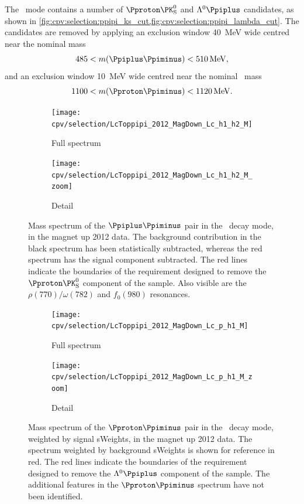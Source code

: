 The \ppipi\ mode contains a number of $\Pproton\PKshort$ and $\PLambda\Ppiplus$
candidates, as shown in
\cref{fig:cpv:selection:ppipi_ks_cut,fig:cpv:selection:ppipi_lambda_cut}.
The candidates are removed by applying an exclusion window \SI{40}{\MeV} wide
centred near the nominal \PKshort mass~\cite{PDG2014}
\begin{equation}
  485 < m(\Ppiplus\Ppiminus) < \SI{510}{\MeV},
\end{equation}
and an exclusion window \SI{10}{\MeV} wide centred near the nominal \PLambda\
mass~\cite{PDG2014}
\begin{equation}
  1100 < m(\Pproton\Ppiminus) < \SI{1120}{\MeV}.
\end{equation}

\begin{figure}
  \begin{subfigure}[b]{0.5\textwidth}
    \texttt{[image: cpv/selection/LcToppipi\_2012\_MagDown\_Lc\_h1\_h2\_M]}
    \caption{Full spectrum}
    \label{fig:cpv:selection:ppipi_ks_cut:full}
  \end{subfigure}
  \begin{subfigure}[b]{0.5\textwidth}
    \texttt{[image: cpv/selection/LcToppipi\_2012\_MagDown\_Lc\_h1\_h2\_M\_zoom]}
    \caption{Detail}
    \label{fig:cpv:selection:ppipi_ks_cut:zoom}
  \end{subfigure}
  \caption{%
    Mass spectrum of the $\Ppiplus\Ppiminus$ pair in the \ppipi\ decay mode, in
    the magnet up 2012 data.
    The background contribution in the black spectrum has been statistically
    subtracted, whereas the red spectrum has the signal component subtracted.
    The red lines indicate the boundaries of the requirement designed to remove
    the $\Pproton\PKshort$ component of the sample.
    Also visible are the $\rho(770)/\omega(782)$ and $f_{0}(980)$ resonances.
  }
  \label{fig:cpv:selection:ppipi_ks_cut}
\end{figure}

\begin{figure}
  \begin{subfigure}[b]{0.5\textwidth}
    \texttt{[image: cpv/selection/LcToppipi\_2012\_MagDown\_Lc\_p\_h1\_M]}
    \caption{Full spectrum}
    \label{fig:cpv:selection:ppipi_lambda_cut:full}
  \end{subfigure}
  \begin{subfigure}[b]{0.5\textwidth}
    \texttt{[image: cpv/selection/LcToppipi\_2012\_MagDown\_Lc\_p\_h1\_M\_zoom]}
    \caption{Detail}
    \label{fig:cpv:selection:ppipi_lambda_cut:zoom}
  \end{subfigure}
  \caption{%
    Mass spectrum of the $\Pproton\Ppiminus$ pair in the \ppipi\ decay mode,
    weighted by signal sWeights, in the magnet up 2012 data.
    The spectrum weighted by background sWeights is shown for reference in red.
    The red lines indicate the boundaries of the requirement designed to remove
    the $\PLambda\Ppiplus$ component of the sample.
    The additional features in the $\Pproton\Ppiminus$ spectrum have not been
    identified.
  }
  \label{fig:cpv:selection:ppipi_lambda_cut}
\end{figure}

